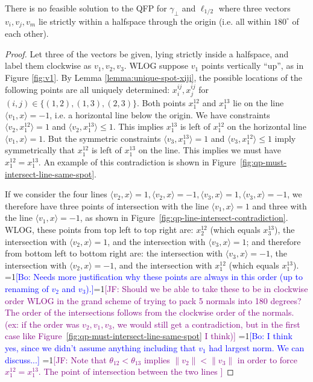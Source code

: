\documentclass[final]{colt2020} %
\newcommand{\Comments}{1}
\newcommand{\mynote}[2]{\ifnum\Comments=1\textcolor{#1}{#2}\fi}
\newcommand{\jessie}[1]{\mynote{purple}{[JF: #1]}}
\newcommand{\bo}[1]{\mynote{blue}{[Bo: #1]}}
\newcommand{\inprod}[2]{\langle #1, #2 \rangle}%
\begin{document}
\begin{lemma} \label{lemma:180-degree-no-three}
	There is no feasible solution to the QFP for $\gamma_{\bot}$ and $\ell_{1/2}$ where three vectors $v_i,v_j,v_m$ lie strictly within a halfspace through the origin (i.e. all within $180^{\circ}$ of each other).
\end{lemma}
\begin{proof}
	Let three of the vectors be given, lying strictly inside a halfspace, and label them clockwise as $v_1,v_2,v_3$.
	WLOG suppose $v_1$ points vertically ``up'', as in Figure \ref{fig:v1}.
	By Lemma \ref{lemma:unique-spot-xiji}, the possible locations of the following points are all uniquely determined: $x^{ij}_i, x^{ij}_j$ for $(i,j) \in \{(1,2),(1,3),(2,3)\}$.
	Both points $x^{12}_1$ and $x^{13}_1$ lie on the line $\inprod{v_1}{x} = -1$, i.e. a horizontal line below the origin.
	We have constraints $\inprod{v_2}{x^{12}_1} = 1$ and $\inprod{v_2}{x^{13}_1} \leq 1$.
	This implies $x^{13}_1$ is left of $x^{12}_1$ on the horizontal line $\inprod{v_1}{x} = 1$. 
	But the symmetric constraints $\inprod{v_3}{x^{13}_1} = 1$ and $\inprod{v_3}{x^{12}_1} \leq 1$ imply symmetrically that $x^{12}_1$ is left of $x^{13}_1$ on the line.
	This implies we must have $x^{12}_1 = x^{13}_1$.
	An example of this contradiction is shown in Figure~\ref{fig:qp-must-intersect-line-same-spot}.
	
	If we consider the four lines $\inprod{v_2}{x}=1, \inprod{v_2}{x}=-1, \inprod{v_3}{x}=1, \inprod{v_3}{x}=-1$, we therefore have three points of intersection with the line $\inprod{v_1}{x}=1$ and three with the line $\inprod{v_1}{x}=-1$, as shown in Figure~\ref{fig:qp-line-intersect-contradiction}. 
	WLOG, these points from top left to top right are: $x^{12}_2$ (which equals $x^{13}_3$), the intersection with $\inprod{v_2}{x}=1$, and the intersection with $\inprod{v_3}{x}=1$; and therefore from bottom left to bottom right are: the intersection with $\inprod{v_3}{x}=-1$, the intersection with $\inprod{v_2}{x}=-1$, and the intersection with $x^{12}_1$ (which equals $x^{13}_1$).
	\bo{Needs more justification why these points are always in this order (up to renaming of $v_2$ and $v_3$).}\jessie{Should we be able to take these to be in clockwise order WLOG in the grand scheme of trying to pack 5 normals into 180 degrees?  The order of the intersections follows from the clockwise order of the normals.  (ex: if the order was $v_2, v_1, v_3$, we would still get a contradiction, but in the first case like Figure~\ref{fig:qp-must-intersect-line-same-spot} I think)} \bo{I think yes, since we didn't assume anything including that $v_1$ had largest norm. We can discuss...}
	\jessie{Note that $\theta_{12} < \theta_{13}$ implies $\|v_2\| < \|v_3\|$ in order to force $x^{12}_1 = x^{13}_1$.  The point of intersection between the two lines }
	

\end{proof}
\end{document}
